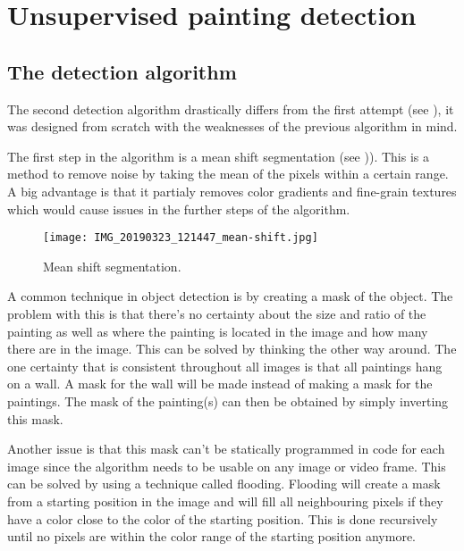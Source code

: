 \section{Unsupervised painting detection}
\label{sec:unsupervised_painting_detection}

\subsection{The detection algorithm}
\label{subsec:detection-algo}

The second detection algorithm drastically differs from the first attempt (see ), it was designed from scratch with the weaknesses of the previous algorithm in mind.

The first step in the algorithm is a mean shift segmentation (see )). This is a method to remove noise by taking the mean of the pixels within a certain range. A big advantage is that it partialy removes color gradients and fine-grain textures which would cause issues in the further steps of the algorithm.

\begin{figure}[h]
    \texttt{[image: IMG\_20190323\_121447\_mean-shift.jpg]}
    \centering
    \caption{Mean shift segmentation.}
    \label{fig:paiting_detection_mean_shift}
\end{figure}

A common technique in object detection is by creating a mask of the object. The problem with this is that there's no certainty about the size and ratio of the painting as well as where the painting is located in the image and how many there are in the image. This can be solved by thinking the other way around. The one certainty that is consistent throughout all images is that all paintings hang on a wall. A mask for the wall will be made instead of making a mask for the paintings. The mask of the painting(s) can then be obtained by simply inverting this mask.

Another issue is that this mask can't be statically programmed in code for each image since the algorithm needs to be usable on any image or video frame. This can be solved by using a technique called flooding. Flooding will create a mask from a starting position in the image and will fill all neighbouring pixels if they have a color close to the color of the starting position. This is done recursively until no pixels are within the color range of the starting position anymore.

